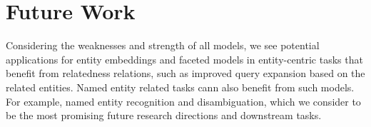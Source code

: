 \section{Future Work}
Considering the weaknesses and strength of all models, we see potential applications for entity embeddings and faceted models in entity-centric tasks that benefit from relatedness relations, such as improved query expansion based on the related entities. Named entity related tasks cann also benefit from such models. For example, named entity recognition and disambiguation, which we consider to be the most promising future research directions and downstream tasks.\\